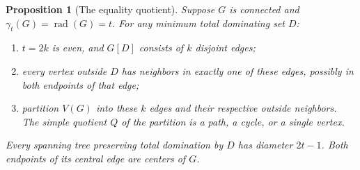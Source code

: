 \documentclass[11pt,a4paper]{article}
\newtheorem{proposition}[theorem]{Proposition}
\theoremstyle{definition}\newtheorem{definition}[theorem]{Definition}
\theoremstyle{remark}\newtheorem{remark}[theorem]{Remark}
\newcommand{\rad}{\operatorname{rad}}
\begin{document}
\begin{proposition}[The equality quotient]
\label{early:prop:equality-quotient}
Suppose $G$ is connected and
$\gamma_t(G)=\rad(G)=t$.  For any minimum total dominating set $D$:
\begin{enumerate}
\item $t=2k$ is even, and $G[D]$ consists of $k$ disjoint edges;
\item every vertex outside $D$ has neighbors in exactly one of these
      edges, possibly in both endpoints of that edge;
\item partition $V(G)$ into these $k$ edges and their respective
      outside neighbors.  The simple quotient $Q$ of the partition
      is a path, a cycle, or a single vertex.
\end{enumerate}
Every spanning tree preserving total domination by $D$ has diameter
$2t-1$.  Both endpoints of its central edge are centers of $G$.
\end{proposition}
\end{document}
